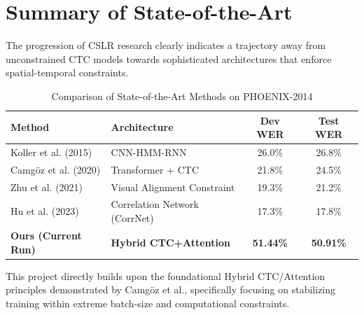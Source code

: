 \section{Summary of State-of-the-Art}

The progression of CSLR research clearly indicates a trajectory away from unconstrained CTC models towards sophisticated architectures that enforce spatial-temporal constraints. 

\begin{table}[H]
\centering
\caption{Comparison of State-of-the-Art Methods on PHOENIX-2014}
\label{tab:sota}
\begin{tabular}{@{}llcc@{}}
\toprule
\textbf{Method} & \textbf{Architecture} & \textbf{Dev WER} & \textbf{Test WER} \\
\midrule
Koller et al. (2015) \cite{koller2015continuous} & CNN-HMM-RNN & 26.0\% & 26.8\% \\
Camgöz et al. (2020) \cite{camgoz2020sign} & Transformer + CTC & 21.8\% & 24.5\% \\
Zhu et al. (2021) \cite{zhu2021visual} & Visual Alignment Constraint & 19.3\% & 21.2\% \\
Hu et al. (2023) \cite{hu2023continuous} & Correlation Network (CorrNet) & 17.3\% & 17.8\% \\
\midrule
\textbf{Ours (Current Run)} & \textbf{Hybrid CTC+Attention} & \textbf{51.44\%} & \textbf{50.91\%} \\
\bottomrule
\end{tabular}
\end{table}

This project directly builds upon the foundational Hybrid CTC/Attention principles demonstrated by Camgöz et al., specifically focusing on stabilizing training within extreme batch-size and computational constraints.
